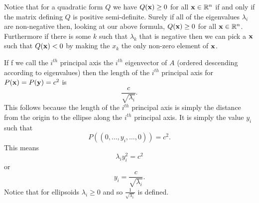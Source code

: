 \documentclass{book}
\begin{document}
Notice that for a quadratic form $Q$ we have $Q({\bf x})\geq 0$ for all ${\bf x}\in\mathbb{R}^n$ if and only if the matrix defining $Q$ is positive semi-definite. Surely if all of the eigenvalues $\lambda_i$ are non-negative then, looking at our above formula, $Q({\bf x})\geq 0$ for all ${\bf x}\in\mathbb{R}^n$. Furthermore if there is some $k$ such that $\lambda_k$ that is negative then we can pick a ${\bf x}$ such that $Q({\bf x})<0$ by making the $x_k$ the only non-zero element of ${\bf x}$.

If f we call the $i^{th}$ principal axis the $i^{th}$ eigenvector of $A$ (ordered descending according to eigenvalues) then the length of the $i^{th}$ principal axis for $P({\bf x})=P({\bf y})=c^2$ is
$$
\frac{c}{\sqrt{\lambda_i}}.
$$
This follows because the length of the $i^{th}$ principal axis is simply the distance from the origin to the ellipse along the $i^{th}$ principal axis. It is simply the value $y_i$ such that
$$
P((0,\ldots,y_i,\ldots,0))=c^2.
$$
This means
$$
\lambda_iy_i^2=c^2
$$
or
$$
y_i=\frac{c}{\sqrt{\lambda_i}}.
$$
Notice that for ellipsoids $\lambda_i\geq 0$ and so $\frac{1}{\sqrt{\lambda_i}}$ is defined. 
\end{document}
